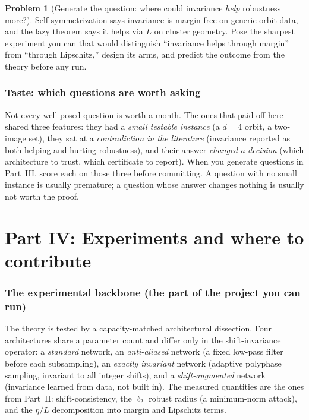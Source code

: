\documentclass[11pt]{article}
\theoremstyle{plain}
\theoremstyle{definition}
\newtheorem{problem}{Problem}[section]
\theoremstyle{remark}
\begin{document}
\begin{problem}[Generate the question: where could invariance \emph{help} robustness more?]\label{pr:help}
Self-symmetrization says invariance is margin-free on generic orbit data, and the lazy theorem says it helps via $L$
on cluster geometry. Pose the sharpest experiment you can that would distinguish ``invariance helps through margin''
from ``through Lipschitz,'' design its arms, and predict the outcome from the theory before any run.
\end{problem}

\section{Taste: which questions are worth asking}

Not every well-posed question is worth a month. The ones that paid off here shared three features: they had a
\emph{small testable instance} (a $d=4$ orbit, a two-image set), they sat at a \emph{contradiction in the literature}
(invariance reported as both helping and hurting robustness), and their answer \emph{changed a decision} (which
architecture to trust, which certificate to report). When you generate questions in Part~III, score each on those
three before committing. A question with no small instance is usually premature; a question whose answer changes
nothing is usually not worth the proof.

\part*{Part IV: Experiments and where to contribute}

\section{The experimental backbone (the part of the project you can run)}

The theory is tested by a capacity-matched architectural dissection. Four architectures share a parameter count and
differ only in the shift-invariance operator: a \emph{standard} network, an \emph{anti-aliased} network (a fixed
low-pass filter before each subsampling), an \emph{exactly invariant} network (adaptive polyphase sampling, invariant
to all integer shifts), and a \emph{shift-augmented} network (invariance learned from data, not built in). The
measured quantities are the ones from Part~II: shift-consistency, the $\ell_2$ robust radius (a minimum-norm attack),
and the $\eta/L$ decomposition into margin and Lipschitz terms.
\end{document}
